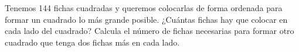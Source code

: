 \documentclass[addpoints,spanish, 12pt,a4paper]{exam}
\begin{document}
\begin{questions}

\question[2] Tenemos 144 fichas cuadradas y queremos colocarlas de forma ordenada para formar un cuadrado lo más grande posible. ¿Cuántas fichas hay que colocar en cada lado del cuadrado? Calcula el número de fichas necesarias para formar otro cuadrado que tenga dos fichas más en cada lado.\vspace{20pt}\vspace{20pt}



\end{questions}
\end{document}
